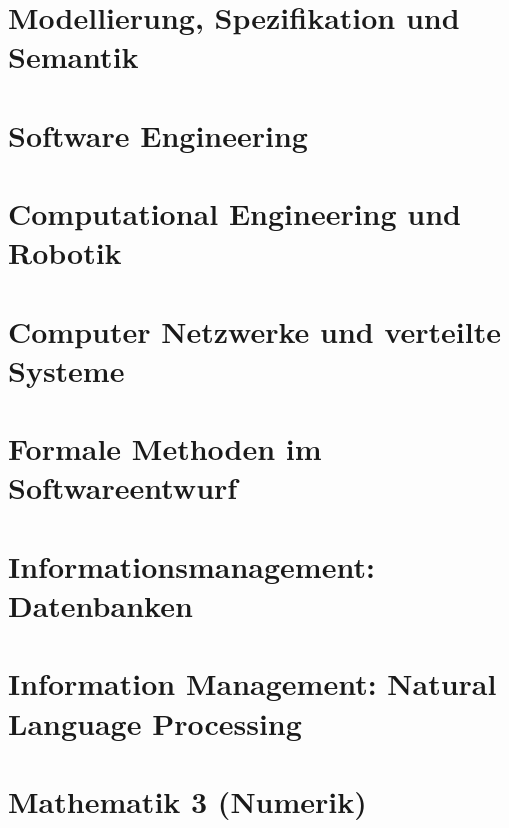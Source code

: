 \part{Modellierung, Spezifikation und Semantik}
\graphicspath{{./mandatory/fs3/moses/}}
\renewcommand{\lstbasepath}{./mandatory/fs3/moses}

\part{Software Engineering}
\graphicspath{{./mandatory/fs3/se/}}
\renewcommand{\lstbasepath}{./mandatory/fs3/se}

\part{Computational Engineering und Robotik}
\graphicspath{{./mandatory/fs4/cer/}}
\renewcommand{\lstbasepath}{./mandatory/fs4/cer}

\part{Computer Netzwerke und verteilte Systeme}
\graphicspath{{./mandatory/fs4/cnuvs/}}
\renewcommand{\lstbasepath}{./mandatory/fs4/cnuvs}

\part{Formale Methoden im Softwareentwurf}
\graphicspath{{./mandatory/fs4/fmse/}}
\renewcommand{\lstbasepath}{./mandatory/fs4/fmse}

\part{Informationsmanagement: Datenbanken}
\graphicspath{{./mandatory/fs4/infman-db/}}
\renewcommand{\lstbasepath}{./mandatory/fs4/infman-db}

\part{Information Management: Natural Language Processing}
\graphicspath{{./mandatory/fs4/infman-nlp/}}
\renewcommand{\lstbasepath}{./mandatory/fs4/infman-nlp}

\part{Mathematik 3 (Numerik)}
\graphicspath{{./mandatory/fs4/mathe3-numerik/}}
\renewcommand{\lstbasepath}{./mandatory/fs4/mathe3-numerik}

